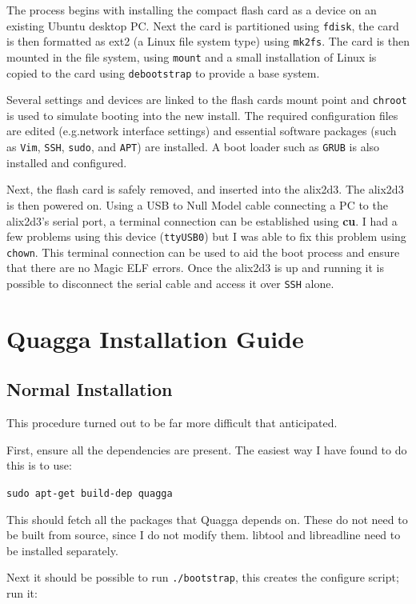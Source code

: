  The process begins with installing the compact flash card as a device on an
 existing Ubuntu desktop PC\@. Next the card is partitioned using \texttt{fdisk},
 the card is then formatted as ext2 (a Linux file system type) using
 \texttt{mk2fs}. The card is then mounted in the file system, using
 \texttt{mount} and a small installation of Linux is copied to the card using
 \texttt{debootstrap} to provide a base system.

 Several settings and devices are linked to the flash cards mount point and
 \texttt{chroot} is used to simulate booting into the new install. The required
 configuration files are edited (e.g.\@ network interface settings) and essential
 software packages (such as \texttt{Vim}, \texttt{SSH}, \texttt{sudo}, and
 \texttt{APT}) are installed. A boot loader such as \texttt{GRUB} is also
 installed and configured.

 Next, the flash card is safely removed, and  inserted into the alix2d3. The
 alix2d3 is then powered on. Using a USB to Null Model cable connecting a PC to
 the alix2d3's serial port, a terminal connection can be established using {\bf
 cu}. I had a few problems using this device (\texttt{ttyUSB0}) but I was able to
 fix this problem using \texttt{chown}. This terminal connection can be used to
 aid the boot process and ensure that there are no Magic ELF errors. Once the
 alix2d3 is up and running it is possible to disconnect the serial cable and
 access it over \texttt{SSH} alone.

 \section{Quagga Installation Guide}

 \subsection{Normal Installation}
This procedure turned out to be far more difficult that anticipated.

First, ensure all the dependencies are present. The easiest
way I have found to do this is to use:

\texttt{sudo apt-get build-dep quagga}

This should fetch all the packages that Quagga depends on. These do not need to
be built from source, since I do not modify them. libtool and libreadline need
to be installed separately. 


Next it should be possible to run \texttt{\@./bootstrap}, this creates the
configure script; run it:

